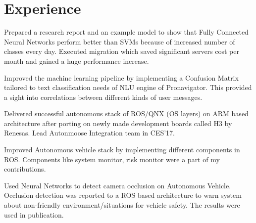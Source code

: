 \documentclass[]{deedy-resume-openfont}
\begin{document}
\hfill
\begin{minipage}[t]{0.63\textwidth} 


\section{Experience}

\vspace{\topsep} %
\begin{tightemize}

\item Prepared a research report and an example model to show that Fully Connected Neural Networks perform better than SVMs because of increased number of classes every day. Executed migration which saved significant servers cost per month and gained a huge performance increase. 

\item Improved the machine learning pipeline by implementing a Confusion Matrix tailored to text classification needs of NLU engine of Pronavigator. This provided a sight into correlations between different kinds of user messages.

\end{tightemize}
\sectionsep

\begin{tightemize}

\item Delivered successful autonomous stack of ROS/QNX (OS layers) on ARM based architecture after porting on newly made development boards called H3 by Renesas. Lead Autonmoose Integration team in CES'17. 

\item Improved Autonomous vehicle stack by implementing different components in ROS. Components like system monitor, risk monitor were a part of my contributions. 

\item Used Neural Networks to detect camera occlusion on Autonomous Vehicle. Occlusion detection was reported to a ROS based architecture to warn system about non-friendly environment/situations for vehicle safety. The results were used in publication.


\end{tightemize}
\end{minipage}
\end{document}
